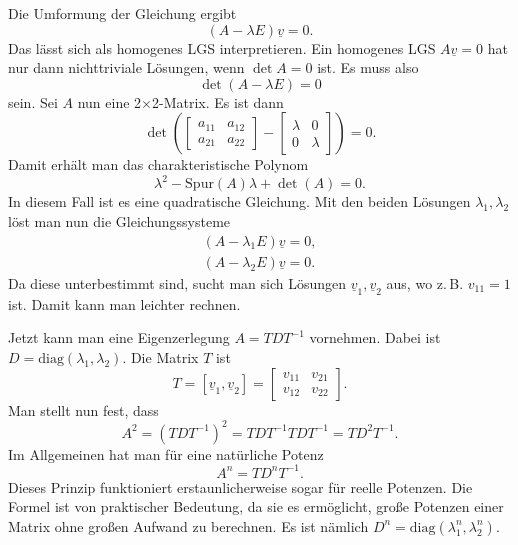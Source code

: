 \documentclass[a4paper,11pt,fleqn,twocolumn,twoside]{scrartcl}
\numberwithin{equation}{section}
\begin{document}
Die Umformung der Gleichung ergibt%
\begin{equation}
(A-\lambda E)\underline v=0.
\end{equation}
Das lässt sich als homogenes LGS interpretieren. Ein homogenes LGS
$A\underline v=0$ hat nur dann nichttriviale Lösungen,
wenn $\det A=0$ ist. Es muss also%
\begin{equation}
\det(A-\lambda E)=0
\end{equation}
sein. Sei $A$ nun eine 2$\times$2-Matrix. Es ist dann%
\begin{equation}
\det\left(\begin{bmatrix}a_{11} & a_{12}\\
a_{21} & a_{22}\end{bmatrix}-
\begin{bmatrix}\lambda & 0\\
0 & \lambda\end{bmatrix}\right)=0.
\end{equation}
Damit erhält man das charakteristische Polynom%
\begin{equation}
\lambda^2 -\mathrm{Spur}(A)\lambda+\det(A)=0.
\end{equation}
In diesem Fall ist es eine quadratische Gleichung.
Mit den beiden Lösungen $\lambda_1,\lambda_2$ löst man nun
die Gleichungssysteme%
\begin{gather*}
(A-\lambda_1 E)\underline v=0,\\
(A-\lambda_2 E)\underline v=0.
\end{gather*}
Da diese unterbestimmt sind, sucht man sich Lösungen
$\underline v_1,\underline v_2$ aus, wo z.\,B. $v_{11}=1$ ist.
Damit kann man leichter rechnen.

Jetzt kann man eine Eigenzerlegung $A=TDT^{-1}$ vornehmen.
Dabei ist $D=\mathrm{diag}(\lambda_1,\lambda_2)$.
Die Matrix $T$ ist%
\begin{equation}
T=[\underline v_1, \underline v_2]=\begin{bmatrix}
v_{11} & v_{21}\\
v_{12} & v_{22}
\end{bmatrix}.
\end{equation}
Man stellt nun fest, dass
\begin{equation}
A^2 = (TDT^{-1})^2 = TDT^{-1}TDT^{-1} = TD^2T^{-1}.
\end{equation}
Im Allgemeinen hat man für eine natürliche Potenz%
\begin{equation}
A^n = TD^nT^{-1}.
\end{equation}
Dieses Prinzip funktioniert erstaunlicherweise sogar für reelle
Potenzen. Die Formel ist von praktischer Bedeutung, da sie es
ermöglicht, große Potenzen einer Matrix ohne großen Aufwand zu
berechnen. Es ist nämlich
$D^n=\mathrm{diag}(\lambda_1^n,\lambda_2^n)$.
\end{document}
